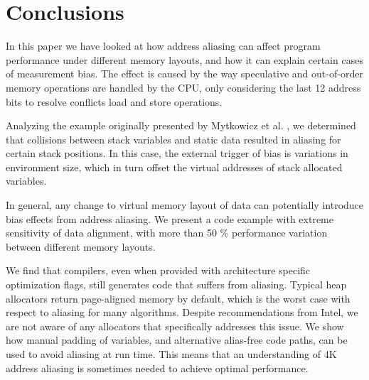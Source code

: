 \documentclass[a4paper,10pt,twocolumn,twoside]{article}
\begin{document}
\fi


\section{Conclusions}
In this paper we have looked at how address aliasing can affect program performance under different memory layouts, and how it can explain certain cases of measurement bias. 
The effect is caused by the way speculative and out-of-order memory operations are handled by the CPU, only considering the last 12 address bits to resolve conflicts load and store operations.

Analyzing the example originally presented by Mytkowicz et al. \cite{Mytkowicz:2009:WrongData}, we determined that collisions between stack variables and static data resulted in aliasing for certain stack positions.
In this case, the external trigger of bias is variations in environment size, which in turn offset the virtual addresses of stack allocated variables.


In general, any change to virtual memory layout of data can potentially introduce bias effects from address aliasing. 
We present a code example with extreme sensitivity of data alignment, with more than 50 \% performance variation between different memory layouts.


We find that compilers, even when provided with architecture specific optimization flags, still generates code that suffers from aliasing. 
Typical heap allocators return page-aligned memory by default, which is the worst case with respect to aliasing for many algorithms.
Despite recommendations from Intel, we are not aware of any allocators that specifically addresses this issue. 
We show how manual padding of variables, and alternative alias-free code paths, can be used to avoid aliasing at run time.
This means that an understanding of 4K address aliasing is sometimes needed to achieve optimal performance. 





\end{document}
